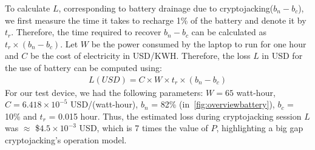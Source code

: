 \documentclass[acmlarge]{acmart}
\newcommand{\cj}{cryptojacking\xspace}
\begin{document}
To calculate $L$, corresponding to battery drainage due to \cj ($b_n-b_c$), we first measure the time it takes to recharge 1\% of the battery and denote it by $t_r$. Therefore, the time required to recover $b_n-b_c$ can be calculated as $t_r \times (b_n-b_c)$. Let $W$ be the power consumed by the laptop to run for one hour and $C$ be the cost of electricity in USD/KWH. Therefore, the loss $L$ in USD for the use of battery can be computed using:  
\begin{eqnarray} 
  \label{equ:loss}  L (USD)  = C \times W \times t_r \times (b_n-b_c) 
\end{eqnarray}
For our test device, we had the following parameters: $W=65$ watt-hour, $C = 6.418 \times 10^{-5}$ USD/(watt-hour), $b_n$ = 82\% (in~\autoref{fig:overviewbattery}), $b_c$ = 10\% and $t_r$ = 0.015 hour. Thus, the estimated loss during \cj session $L$ was $\approx$ \$$4.5 \times 10^{-3}$ USD, which is 7 times the value of $P$, highlighting a big gap \cj{}'s operation model. 
\end{document}
